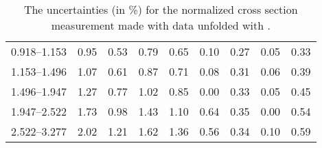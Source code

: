 \begin{table}
\begin{center}
{\begin{tabular}{@{}l l l l l l l l l@{}}
                0.918--1.153    &  0.95   &  0.53   &  0.79         &  0.65      &  0.10    &  0.27  &  0.05       &  0.33  \\
                1.153--1.496    &  1.07   &  0.61   &  0.87         &  0.71      &  0.08    &  0.31  &  0.06       &  0.39  \\
                1.496--1.947    &  1.27   &  0.77   &  1.02         &  0.85      &  0.00    &  0.33  &  0.05       &  0.45  \\
                1.947--2.522    &  1.73   &  0.98   &  1.43         &  1.10      &  0.64    &  0.35  &  0.00       &  0.54  \\
                2.522--3.277    &  2.02   &  1.21   &  1.62         &  1.36      &  0.56    &  0.34  &  0.10       &  0.59  \\
                \bottomrule
            \end{tabular}
        }
    \end{center}
    \caption[
        The uncertainties for the normalized cross section measurement made
        with data unfolded with \MADGRAPH.
    ]{
        The uncertainties (in \%) for the normalized cross section measurement
        made with data unfolded with \MADGRAPH.
    }
    \label{tab:sys_uncert_norm}
\end{table}
